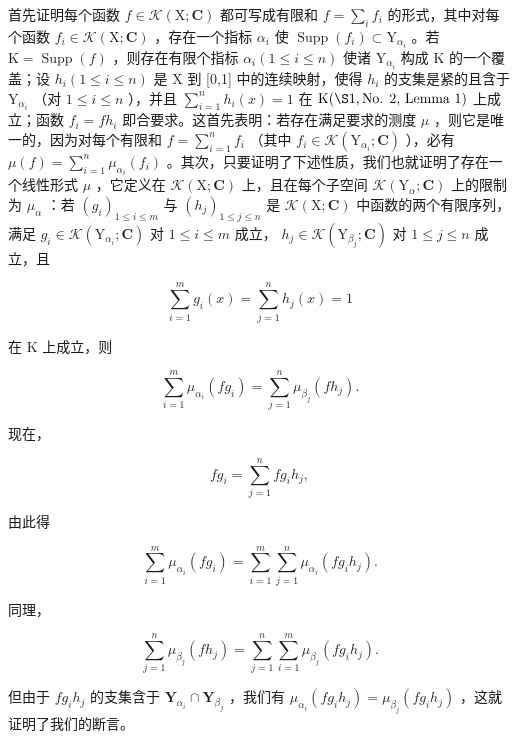 首先证明每个函数 \(f \in \mathcal{K}(\mathrm{X};\mathbf{C})\) 都可写成有限和 \(f = \sum_{i} f_{i}\) 的形式，其中对每个函数 \(f_{i} \in \mathcal{K}(\mathrm{X};\mathbf{C})\) ，存在一个指标 \(\alpha_{i}\) 使 \(\operatorname{Supp}(f_{i}) \subset \mathrm{Y}_{\alpha_{i}}\) 。若 \(\mathrm{K} = \operatorname{Supp}(f)\) ，则存在有限个指标 \(\alpha_{i} (1 \leqslant i \leqslant n)\) 使诸 \(\mathrm{Y}_{\alpha_{i}}\) 构成 \(\mathrm{K}\) 的一个覆盖；设 \(h_{i} (1 \leqslant i \leqslant n)\) 是 \(\mathrm{X}\) 到 {[}0,1{]} 中的连续映射，使得 \(h_{i}\) 的支集是紧的且含于 \(\mathrm{Y}_{\alpha_{i}}\) （对 \(1 \leqslant i \leqslant n\) ），并且 \(\sum_{i=1}^{n} h_{i}(x) = 1\) 在 \(\mathrm{K} (\S 1, \text{No. 2, Lemma 1})\) 上成立；函数 \(f_{i} = f h_{i}\) 即合要求。这首先表明：若存在满足要求的测度 \(\mu\) ，则它是唯一的，因为对每个有限和 \(f = \sum_{i=1}^{n} f_{i}\) （其中 \(f_{i} \in \mathcal{K}(\mathrm{Y}_{\alpha_{i}}; \mathbf{C})\) ），必有 \(\mu(f) = \sum_{i=1}^{n} \mu_{\alpha_{i}}(f_{i})\) 。其次，只要证明了下述性质，我们也就证明了存在一个线性形式 \(\mu\) ，它定义在 \(\mathcal{K}(\mathrm{X};\mathbf{C})\) 上，且在每个子空间 \(\mathcal{K}(\mathrm{Y}_{\alpha};\mathbf{C})\) 上的限制为 \(\mu_{\alpha}\) ：若 \((g_{i})_{1 \leqslant i \leqslant m}\) 与 \((h_{j})_{1 \leqslant j \leqslant n}\) 是 \(\mathcal{K}(\mathrm{X};\mathbf{C})\) 中函数的两个有限序列，满足 \(g_{i} \in \mathcal{K}(\mathrm{Y}_{\alpha_{i}}; \mathbf{C})\) 对 \(1 \leqslant i \leqslant m\) 成立， \(h_{j} \in \mathcal{K}(\mathrm{Y}_{\beta_{j}}; \mathbf{C})\) 对 \(1 \leqslant j \leqslant n\) 成立，且

\[
\sum_ {i = 1} ^ {m} g _ {i} (x) = \sum_ {j = 1} ^ {n} h _ {j} (x) = 1
\]

在 K 上成立，则

\[
\sum_ {i = 1} ^ {m} \mu_ {\alpha_ {i}} (f g _ {i}) = \sum_ {j = 1} ^ {n} \mu_ {\beta_ {j}} (f h _ {j}).
\]

现在，

\[
f g _ {i} = \sum_ {j = 1} ^ {n} f g _ {i} h _ {j},
\]

由此得

\[
\sum_ {i = 1} ^ {m} \mu_ {\alpha_ {i}} (f g _ {i}) = \sum_ {i = 1} ^ {m} \sum_ {j = 1} ^ {n} \mu_ {\alpha_ {i}} (f g _ {i} h _ {j}).
\]

同理，

\[
\sum_ {j = 1} ^ {n} \mu_ {\beta_ {j}} (f h _ {j}) = \sum_ {j = 1} ^ {n} \sum_ {i = 1} ^ {m} \mu_ {\beta_ {j}} (f g _ {i} h _ {j}).
\]

但由于 \(fg_{i}h_{j}\) 的支集含于 \(\mathbf{Y}_{\alpha_i}\cap \mathbf{Y}_{\beta_j}\) ，我们有 \(\mu_{\alpha_i}(fg_i h_j) = \mu_{\beta_j}(fg_i h_j)\) ，这就证明了我们的断言。


